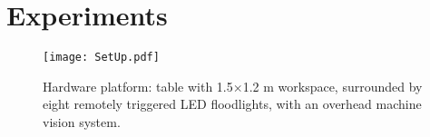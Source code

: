 
\section{Experiments}\label{sec:expResults}




\begin{figure}
\begin{center}
	\texttt{[image: SetUp.pdf]}
\end{center}
\caption{\label{fig:setup}
Hardware platform:  table with 1.5$\times$1.2 m workspace, surrounded by eight remotely triggered LED floodlights, with an overhead machine vision system.
}
\end{figure}











